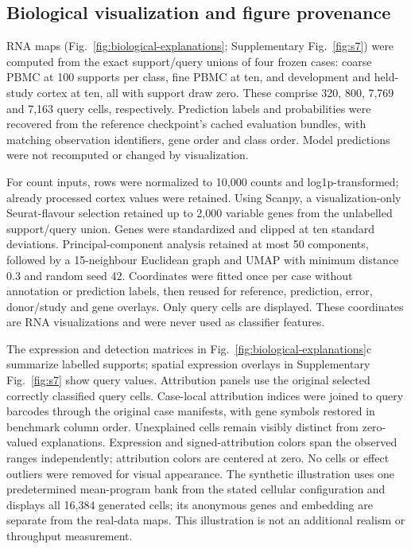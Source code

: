 \subsection*{Biological visualization and figure provenance}
RNA maps (Fig.~\ref{fig:biological-explanations}; Supplementary Fig.~\ref{fig:s7}) were computed from the exact support/query unions of four frozen cases: coarse PBMC at 100 supports per class, fine PBMC at ten, and development and held-study cortex at ten, all with support draw zero. These comprise 320, 800, 7,769 and 7,163 query cells, respectively. Prediction labels and probabilities were recovered from the reference checkpoint's cached evaluation bundles, with matching observation identifiers, gene order and class order. Model predictions were not recomputed or changed by visualization.

For count inputs, rows were normalized to 10,000 counts and log1p-transformed; already processed cortex values were retained. Using Scanpy\cite{wolf2018scanpy}, a visualization-only Seurat-flavour selection retained up to 2,000 variable genes from the unlabelled support/query union. Genes were standardized and clipped at ten standard deviations. Principal-component analysis retained at most 50 components, followed by a 15-neighbour Euclidean graph and UMAP\cite{mcinnes2018umap} with minimum distance 0.3 and random seed 42. Coordinates were fitted once per case without annotation or prediction labels, then reused for reference, prediction, error, donor/study and gene overlays. Only query cells are displayed. These coordinates are RNA visualizations and were never used as classifier features.

The expression and detection matrices in Fig.~\ref{fig:biological-explanations}c summarize labelled supports; spatial expression overlays in Supplementary Fig.~\ref{fig:s7} show query values. Attribution panels use the original selected correctly classified query cells. Case-local attribution indices were joined to query barcodes through the original case manifests, with gene symbols restored in benchmark column order. Unexplained cells remain visibly distinct from zero-valued explanations. Expression and signed-attribution colors span the observed ranges independently; attribution colors are centered at zero. No cells or effect outliers were removed for visual appearance. The synthetic illustration uses one predetermined mean-program bank from the stated cellular configuration and displays all 16,384 generated cells; its anonymous genes and embedding are separate from the real-data maps. This illustration is not an additional realism or throughput measurement.

